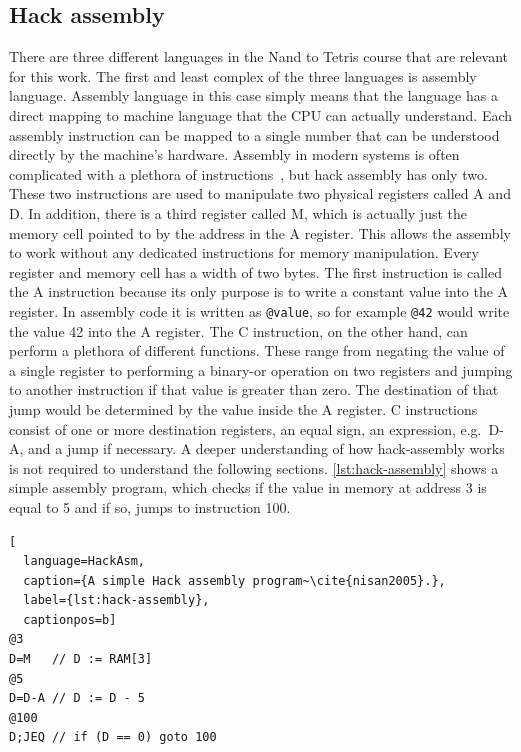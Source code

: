 \subsection{Hack assembly} \label{hack-assembly}
There are three different languages in the Nand to Tetris course that are relevant for this work.
The first and least complex of the three languages is assembly language.
Assembly language in this case simply means that the language has a direct mapping to machine language that the CPU can actually understand.
Each assembly instruction can be mapped to a single number that can be understood directly by the machine's hardware.
Assembly in modern systems is often complicated with a plethora of instructions~\cite{guide2011intel}, but hack assembly has only two.
These two instructions are used to manipulate two physical registers called A and D.
In addition, there is a third register called M, which is actually just the memory cell pointed to by the address in the A register.
This allows the assembly to work without any dedicated instructions for memory manipulation.
Every register and memory cell has a width of two bytes.
The first instruction is called the A instruction because its only purpose is to write a constant value into the A register.
In assembly code it is written as \verb+@value+, so for example \verb+@42+ would write the value 42 into the A register.
The C instruction, on the other hand, can perform a plethora of different functions.
These range from negating the value of a single register to performing a binary-or operation on two registers and jumping to another instruction if that value is greater than zero.
The destination of that jump would be determined by the value inside the A register.
C instructions consist of one or more destination registers, an equal sign, an expression, e.g.\ D-A, and a jump if necessary.
A deeper understanding of how hack-assembly works is not required to understand the following sections.
\cref{lst:hack-assembly} shows a simple assembly program, which checks if the value in memory at address 3 is equal to 5 and if so, jumps to instruction 100.

\begin{lstlisting}[
  language=HackAsm,
  caption={A simple Hack assembly program~\cite{nisan2005}.},
  label={lst:hack-assembly},
  captionpos=b]
@3
D=M   // D := RAM[3]
@5
D=D-A // D := D - 5
@100
D;JEQ // if (D == 0) goto 100
\end{lstlisting}

